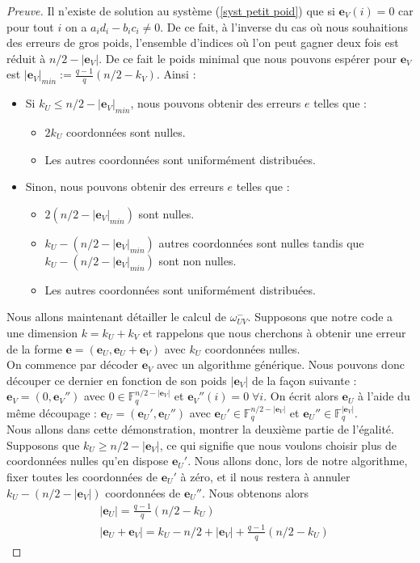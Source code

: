 \documentclass[12pt]{article}
\theoremstyle{plain}
\newcommand{\F}{\mathbb{F}}
\newcommand{\e}{\mathbf{e}}
\begin{document}
\begin{proof}[Preuve]
Il n'existe de solution au système (\ref{syst petit poid}) que si $\e_V(i)=0$ car pour tout $i$ on a $a_id_i -b_ic_i \neq 0$. De ce fait, à l'inverse du cas où nous souhaitions des erreurs de gros poids, l'ensemble d'indices où l'on peut gagner deux fois est réduit à $n/2 - |\e_V|$. De ce fait le poids minimal que nous pouvons espérer pour $\e_V$ est $|\e_V|_{min} := \frac{q-1}{q}(n/2-k_V)$. Ainsi :
\begin{itemize}
\item Si $k_U \leq n/2 - |\e_V|_{min}$, nous pouvons obtenir des erreurs $e$ telles que :
	\begin{itemize}
	\item $2k_U$ coordonnées sont nulles.
	\item Les autres coordonnées sont uniformément distribuées.
	\end{itemize}
\item Sinon, nous pouvons obtenir des erreurs $e$ telles que :
	\begin{itemize}
	\item $2(n/2 - |\e_V|_{min})$ sont nulles.
	\item $k_U - (n/2 - |\e_V|_{min})$ autres coordonnées sont nulles tandis que $k_U - (n/2 - |\e_V|_{min})$ sont non nulles.
	\item Les autres coordonnées sont uniformément distribuées.
	\end{itemize}
\end{itemize} 


\noindent Nous allons maintenant détailler le calcul de $\omega_{UV}^-$. Supposons que notre code a une dimension $k = k_U + k_V$ et rappelons que nous cherchons à obtenir une erreur de la forme $\e = (\e_U,\e_U + \e_V)$ avec $k_U$ coordonnées nulles.\\
\noindent On commence par décoder $\e_V$ avec un algorithme générique. 
Nous pouvons donc découper ce dernier en fonction de son poids $|\e_V|$ de la façon suivante : $ \e_V = (0, \e_V'')$ avec $0 \in \F_q^{n/2-|\e_V|}$ et $\e_V''(i) = 0 \;\forall i$.
On écrit alors $\e_U$ à l'aide du même découpage : $\e_U = (\e_U', \e_U'')$ avec $\e_U' \in \F_q^{n/2-|\e_V|}$ et $\e_U'' \in \F_q^{|\e_V|}$.\\

\noindent Nous allons dans cette démonstration, montrer la deuxième partie de l'égalité. Supposons que $k_U \geq n/2 - |\e_V|$, ce qui signifie que nous voulons choisir plus de coordonnées nulles qu'en dispose $\e_U'$. 
Nous allons donc, lors de notre algorithme, fixer toutes les coordonnées de $\e_U'$ à zéro, et il nous restera à annuler $k_U - (n/2 -|\e_V|)$ coordonnées de $\e_U''$.
Nous obtenons alors 
\begin{equation*}
\begin{split}
&|\e_U| = \frac{q-1}{q}(n/2-k_U) \\
&|\e_U + \e_V| = k_U - n/2 + |\e_V| + \frac{q-1}{q}(n/2 -k_U)
\end{split}
\end{equation*}


\end{proof}
\end{document}
